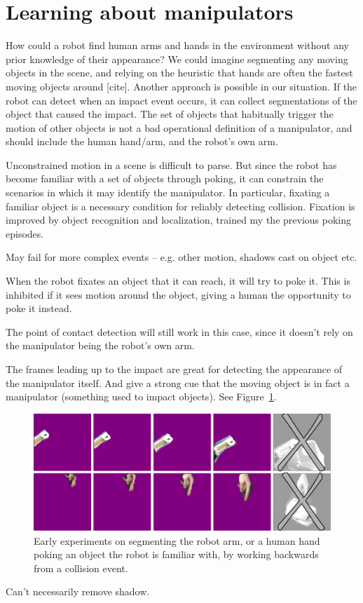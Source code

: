 
\section{Learning about manipulators}

How could a robot find human arms and hands in the environment without
any prior knowledge of their appearance?  We could imagine segmenting
any moving objects in the scene, and relying on the heuristic that
hands are often the fastest moving objects around [cite].
Another approach is possible in our situation.  If the robot can
detect when an impact event occurs, it can collect segmentations of the
object that caused the impact.  The set of objects that habitually
trigger the motion of other objects is not a bad operational 
definition of a manipulator, and should include the human hand/arm,
and the robot's own arm.

Unconstrained motion in a scene is difficult to parse.  But since the
robot has become familiar with a set of objects through poking, it can
constrain the scenarios in which it may identify the manipulator.  In
particular, fixating a familiar object is a necessary condition for
reliably detecting collision.  Fixation is improved by object recognition
and localization, trained my the previous poking episodes.

May fail for more complex events -- e.g. other motion, shadows cast on
object etc.

When the robot fixates an object that it can reach, it will try to poke it.
This is inhibited if it sees motion around the object, giving a human the
opportunity to poke it instead.

The point of contact detection will still work in this case, since it 
doesn't rely on the manipulator being the robot's own arm.

The frames leading up to the impact are great for detecting the
appearance of the manipulator itself.  And give a strong cue that the
moving object is in fact a manipulator (something used to impact
objects).  See Figure~\ref{fig:manipulator}.

\begin{figure}[tbh]
  \centerline{\includegraphics[width=\textwidth]{manipulator-segment}}
  \caption{Early experiments on segmenting the robot arm, or a 
human hand poking an object the robot is familiar with, by working
backwards from a collision event.}
  \label{fig:manipulator}
\end{figure}

Can't necessarily remove shadow.
